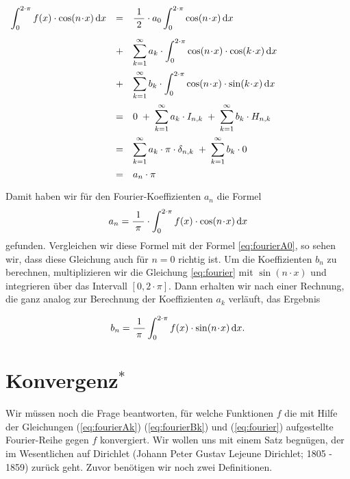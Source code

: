 $
\begin{array}[t]{lcl}
      \displaystyle \int_0^{2\cdot\pi}f(x)\cdot\cos(n\!\cdot\!x)\,\dr x 
& = & \displaystyle \bruch{1}{2}\cdot a_0  \int_0^{2\cdot\pi} \cos(n\!\cdot\!x)\,\dr x  \\[0.5cm]
& + & \displaystyle \sum\limits_{k=1}^\infty a_k\cdot \int_0^{2\cdot\pi} \cos(n\!\cdot\!x)\cdot\cos(k\!\cdot\!x) \,\dr x \\[0.5cm]
& + & \displaystyle \sum\limits_{k=1}^\infty b_k\cdot \int_0^{2\cdot\pi} \cos(n\!\cdot\!x)\cdot\sin(k\!\cdot\!x) \,\dr x \\[0.5cm]
& = & \displaystyle 0 \;+\; \sum\limits_{k=1}^\infty a_k\cdot I_{n,k} \;+\; \sum\limits_{k=1}^\infty b_k\cdot H_{n,k} \\[0.5cm]
& = & \displaystyle \sum\limits_{k=1}^\infty a_k\cdot \pi\cdot \delta_{n,k} \;+\; \sum\limits_{k=1}^\infty b_k\cdot 0 \\[0.5cm]
& = & \displaystyle a_n\cdot \pi \\[0.3cm]
\end{array}  
$
\\[0.1cm]
Damit haben wir f\"ur den Fourier-Koeffizienten $a_n$ die Formel 
\begin{equation}
  \label{eq:fourierAk}
 a_n = \displaystyle\frac{\;\displaystyle1\;}{\;\displaystyle\pi\;} \cdot\int_0^{2\cdot\pi}f(x)\cdot\cos(n\!\cdot\!x)\,\textrm{d} x   
\end{equation}
gefunden.  Vergleichen wir diese Formel mit der Formel \ref{eq:fourierA0}, so sehen wir, dass diese Gleichung
auch f\"ur $n=0$ richtig ist.
Um die Koeffizienten $b_n$ zu berechnen, multiplizieren wir die Gleichung
\ref{eq:fourier} mit $\sin(n\!\cdot\!x)$ und integrieren \"uber das Intervall $[0,2\!\cdot\!\pi]$. Dann  erhalten wir
nach einer Rechnung, die ganz analog zur Berechnung der Koeffizienten $a_k$ verl\"auft, das Ergebnis

\begin{equation}
  \label{eq:fourierBk}
 b_n = \displaystyle\frac{\;\displaystyle1\;}{\;\displaystyle\pi\;} \int_0^{2\cdot\pi}f(x)\cdot\sin(n\!\cdot\!x)\,\textrm{d} x.   
\end{equation}

\section{Konvergenz$^*$}
Wir m\"ussen noch die Frage beantworten, f\"ur welche Funktionen $f$ die mit Hilfe der Gleichungen (\ref{eq:fourierAk})
(\ref{eq:fourierBk}) und (\ref{eq:fourier})  aufgestellte Fourier-Reihe gegen $f$ konvergiert. 
Wir wollen uns mit einem Satz begn\"ugen, der im Wesentlichen auf Dirichlet 
(Johann Peter Gustav Lejeune Dirichlet; 1805 - 1859) zur\"uck geht.
Zuvor ben\"otigen wir noch zwei Definitionen.

